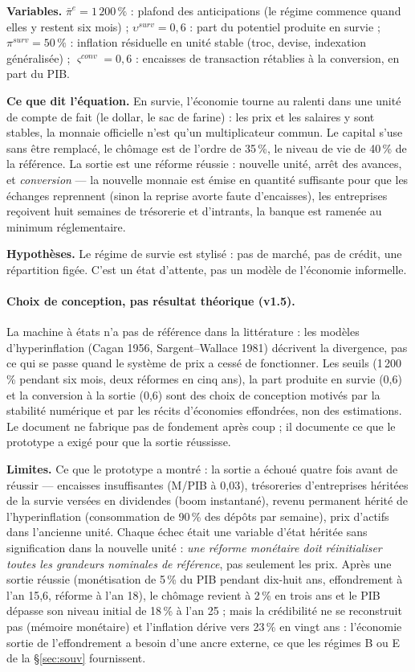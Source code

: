\documentclass[11pt,a4paper]{article}
\newcommand{\variables}{\par\noindent\textbf{Variables.} }
\newcommand{\sens}{\par\noindent\textbf{Ce que dit l'équation.} }
\newcommand{\hyp}{\par\noindent\textbf{Hypothèses.} }
\newcommand{\limites}{\par\noindent\textbf{Limites.} }
\begin{document}
\begin{lecture}
\variables $\bar\pi^e=1\,200\,\%$ : plafond des anticipations (le régime commence quand elles y restent six mois) ; $\upsilon^{surv}=0{,}6$ : part du potentiel produite en survie ; $\pi^{surv}=50\,\%$ : inflation résiduelle en unité stable (troc, devise, indexation généralisée) ; $\varsigma^{conv}=0{,}6$ : encaisses de transaction rétablies à la conversion, en part du PIB.
\sens En survie, l'économie tourne au ralenti dans une unité de compte de fait (le dollar, le sac de farine) : les prix et les salaires y sont stables, la monnaie officielle n'est qu'un multiplicateur commun. Le capital s'use sans être remplacé, le chômage est de l'ordre de 35\,\%, le niveau de vie de 40\,\% de la référence. La sortie est une réforme réussie : nouvelle unité, arrêt des avances, et \emph{conversion} — la nouvelle monnaie est émise en quantité suffisante pour que les échanges reprennent (sinon la reprise avorte faute d'encaisses), les entreprises reçoivent huit semaines de trésorerie et d'intrants, la banque est ramenée au minimum réglementaire.
\hyp Le régime de survie est stylisé : pas de marché, pas de crédit, une répartition figée. C'est un état d'attente, pas un modèle de l'économie informelle.
\paragraph{Choix de conception, pas résultat théorique (v1.5).} La machine à états n'a pas de référence dans la littérature : les modèles d'hyperinflation (Cagan 1956, Sargent--Wallace 1981) décrivent la divergence, pas ce qui se passe quand le système de prix a cessé de fonctionner. Les seuils (1\,200\,\% pendant six mois, deux réformes en cinq ans), la part produite en survie (0,6) et la conversion à la sortie (0,6) sont des choix de conception motivés par la stabilité numérique et par les récits d'économies effondrées, non des estimations. Le document ne fabrique pas de fondement après coup ; il documente ce que le prototype a exigé pour que la sortie réussisse.
\limites Ce que le prototype a montré : la sortie a échoué quatre fois avant de réussir — encaisses insuffisantes (M/PIB à 0,03), trésoreries d'entreprises héritées de la survie versées en dividendes (boom instantané), revenu permanent hérité de l'hyperinflation (consommation de 90\,\% des dépôts par semaine), prix d'actifs dans l'ancienne unité. Chaque échec était une variable d'état héritée sans signification dans la nouvelle unité : \emph{une réforme monétaire doit réinitialiser toutes les grandeurs nominales de référence}, pas seulement les prix. Après une sortie réussie (monétisation de 5\,\% du PIB pendant dix-huit ans, effondrement à l'an 15,6, réforme à l'an 18), le chômage revient à 2\,\% en trois ans et le PIB dépasse son niveau initial de 18\,\% à l'an 25 ; mais la crédibilité ne se reconstruit pas (mémoire monétaire) et l'inflation dérive vers 23\,\% en vingt ans : l'économie sortie de l'effondrement a besoin d'une ancre externe, ce que les régimes B ou E de la \S\ref{sec:souv} fournissent.
\end{lecture}
\end{document}
